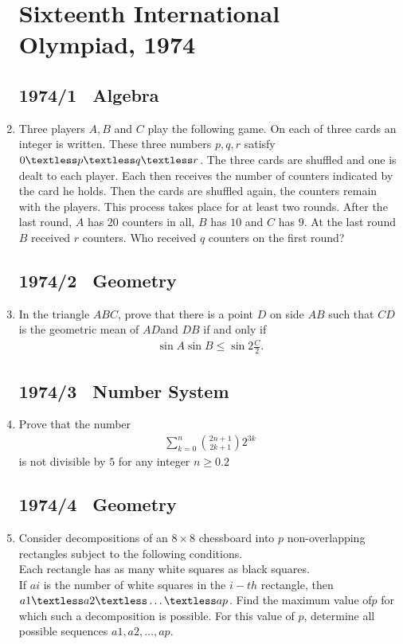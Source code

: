 \documentclass{article}
\begin{document}
\begin{enumerate}
		\section*{Sixteenth International Olympiad, 1974}
		\subsection*{1974/1 \ Algebra}
\item Three players $A,B$ and $C$ play the following game. On each of three cards an integer is written. These three numbers $p, q, r$ satisfy$ 0 \textless p \textless q \textless r$. The three cards are shuffled and one is dealt to each player. Each then receives the number of counters indicated by the card he holds. Then the cards are shuffled again, the counters remain with the players. This process  takes place for at least two rounds. After the last round, $A$ has $20$ counters in all, $B$ has $10$ and $C$ has $9$. At the last round $B$ received $r$ counters. Who received $q$ counters on the first round?

	\subsection*{1974/2 \ Geometry}
\item In the triangle $ABC$, prove that there is a point $D$ on side $AB$ such that $CD$ is the geometric mean of $AD $and $DB$ if and only if
	\begin{align}\sin A \sin B \leq \sin 2 \frac{C}{2}.\end{align}
		\subsection*{1974/3 \ Number System}
	\item Prove that the number \begin{align} \sum_{k=0}^{n}\binom{2n+1}{2k+1}2^{3k}
	\end{align} is not divisible by $5$ for any integer
		$n \geq 0.2$
		\subsection*{1974/4 \ Geometry}
	\item Consider decompositions of an $8\times8$ chessboard into $p$ non-overlapping rectangles subject to the following conditions.\\  Each rectangle has as many white squares as black squares.\\  If $ai$ is the number of white squares in the $i-th$ rectangle, then $a1 \textless a2 \textless \ldots \textless ap$. Find the maximum value of$ p$ for which such a decomposition is possible. For this value of $p$, determine all possible sequences $a1, a2, \ldots, ap$.

\end{enumerate}
\end{document}
